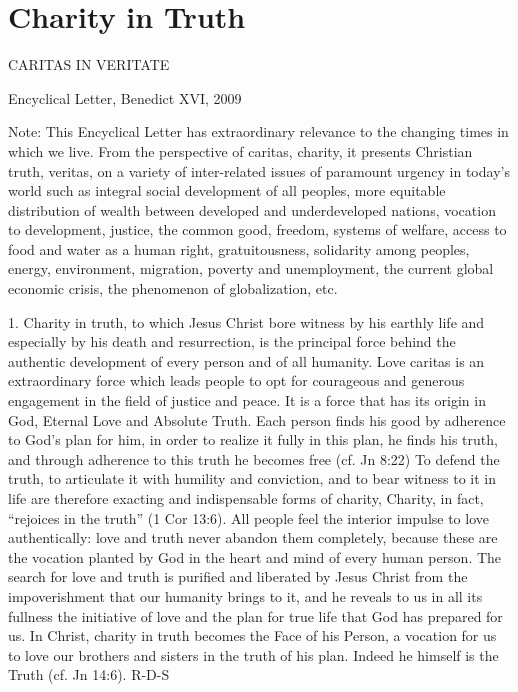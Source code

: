 \documentclass[oneside]{book}
\begin{document}

\chapter{Charity in Truth}

CARITAS IN VERITATE

Encyclical Letter, Benedict XVI, 2009

Note: This Encyclical Letter has extraordinary relevance to the changing times
in which we live. From the perspective of caritas, charity, it presents
Christian truth, veritas, on a variety of inter-related issues of paramount
urgency in today's world such as integral social development of all peoples,
more equitable distribution of wealth between developed and underdeveloped
nations, vocation to development, justice, the common good, freedom, systems of
welfare, access to food and water as a human right, gratuitousness, solidarity
among peoples, energy, environment, migration, poverty and unemployment, the
current global economic crisis, the phenomenon of globalization, etc.

1. Charity in truth, to which Jesus Christ bore witness by his earthly life and
especially by his death and resurrection, is the principal force behind the
authentic development of every person and of all humanity. Love  caritas  is an
extraordinary force which leads people to opt for courageous and generous
engagement in the field of justice and peace. It is a force that has its origin
in God, Eternal Love and Absolute Truth. Each person finds his good by adherence
to God's plan for him, in order to realize it fully in this plan, he finds his
truth, and through adherence to this truth he becomes free (cf. Jn 8:22) To
defend the truth, to articulate it with humility and conviction, and to bear
witness to it in life are therefore exacting and indispensable forms of charity,
Charity, in fact, ``rejoices in the truth'' (1 Cor 13:6). All people feel the
interior impulse to love authentically: love and truth never abandon them
completely, because these are the vocation planted by God in the heart and mind
of every human person. The search for love and truth is purified and liberated
by Jesus Christ from the impoverishment that our humanity brings to it, and he
reveals to us in all its fullness the initiative of love and the plan for true
life that God has prepared for us. In Christ, charity in truth becomes the Face
of his Person, a vocation for us to love our brothers and sisters in the truth
of his plan. Indeed he himself is the Truth (cf. Jn 14:6).
R-D-S
\end{document}
